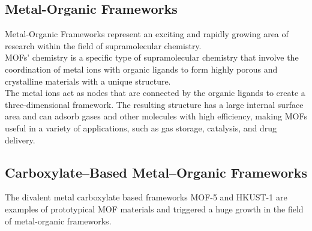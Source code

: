 \documentclass[../Master.tex]{subfiles}
\begin{document}
\subsection{Metal-Organic Frameworks}\label{subsec:mof}

Metal-Organic Frameworks represent an exciting and rapidly growing area of research within the field of supramolecular chemistry.\\
MOFs' chemistry is a specific type of supramolecular chemistry that involve the coordination of metal ions with organic ligands to form highly porous and crystalline materials with a unique structure. \\
The metal ions act as nodes that are connected by the organic ligands to create a three-dimensional framework. The resulting structure has a large internal surface area and can adsorb gases and other molecules with high efficiency, making MOFs useful in a variety of applications, such as gas storage, catalysis, and drug delivery.

\subsection{Carboxylate–Based Metal–Organic Frameworks}\label{cb-mof}

The divalent metal carboxylate based frameworks MOF-5 and HKUST-1 are examples of prototypical MOF materials and triggered a huge growth in the field of metal-organic frameworks.
\end{document}
